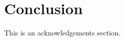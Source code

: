 \documentclass[ba]{imsart}
\numberwithin{equation}{section}
\theoremstyle{plain}
\begin{document}
\section{Conclusion}

\begin{supplement}
\end{supplement}




\begin{acks}[Acknowledgments]
This is an acknowledgements section.
\end{acks}
\end{document}
